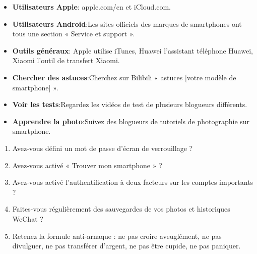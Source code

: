 

\begin{itemize}
  \item \textbf{Utilisateurs Apple}: apple.com/cn et iCloud.com.
  \item \textbf{Utilisateurs Android}:Les sites officiels des marques de smartphones ont tous une section « Service et support ».
  \item \textbf{Outils généraux}: Apple utilise iTunes, Huawei l’assistant téléphone Huawei, Xiaomi l’outil de transfert Xiaomi.
\end{itemize}


\begin{itemize}
  \item \textbf{Chercher des astuces}:Cherchez sur Bilibili « astuces [votre modèle de smartphone] ».
  \item \textbf{Voir les tests}:Regardez les vidéos de test de plusieurs blogueurs différents.
  \item \textbf{Apprendre la photo}:Suivez des blogueurs de tutoriels de photographie sur smartphone.
\end{itemize}


\begin{enumerate}
  \item Avez-vous défini un mot de passe d'écran de verrouillage ?
  \item Avez-vous activé « Trouver mon smartphone » ?
  \item Avez-vous activé l'authentification à deux facteurs sur les comptes importants ?
  \item Faites-vous régulièrement des sauvegardes de vos photos et historiques WeChat ?
  \item Retenez la formule anti-arnaque : ne pas croire aveuglément, ne pas divulguer, ne pas transférer d'argent, ne pas être cupide, ne pas paniquer.
\end{enumerate}
